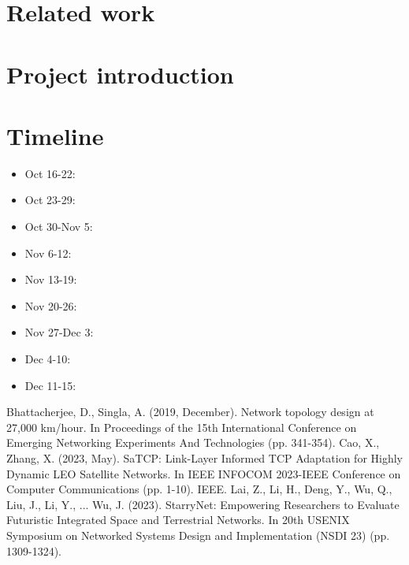 \documentclass[conference]{IEEEtran}
\begin{document}
\section{Related work}




\section{Project introduction}



\section{Timeline}


\begin{itemize}
\item Oct 16-22:
\item Oct 23-29:
\item Oct 30-Nov 5:
\item Nov 6-12:
\item Nov 13-19:
\item Nov 20-26:
\item Nov 27-Dec 3:
\item Dec 4-10:
\item Dec 11-15:
\end{itemize}

\begin{thebibliography}{00}
 Bhattacherjee, D.,  Singla, A. (2019, December). Network topology design at 27,000 km/hour. In Proceedings of the 15th International Conference on Emerging Networking Experiments And Technologies (pp. 341-354).
 Cao, X.,  Zhang, X. (2023, May). SaTCP: Link-Layer Informed TCP Adaptation for Highly Dynamic LEO Satellite Networks. In IEEE INFOCOM 2023-IEEE Conference on Computer Communications (pp. 1-10). IEEE.
  Lai, Z., Li, H., Deng, Y., Wu, Q., Liu, J., Li, Y., ...  Wu, J. (2023). {StarryNet}: Empowering Researchers to Evaluate Futuristic Integrated Space and Terrestrial Networks. In 20th USENIX Symposium on Networked Systems Design and Implementation (NSDI 23) (pp. 1309-1324).
\end{thebibliography}
\end{document}
